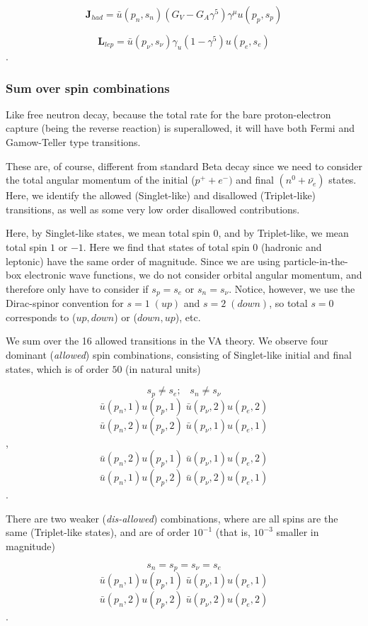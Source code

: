 \documentclass[%
 aip,
 jmp,%
 amsmath,amssymb,
 reprint,%
]{revtex4-1}
\begin{document}
$$\mathbf{J}_{had}=\bar{u}(p_{n},s_{n})(G_{V}-G_{A}\gamma^{5})\gamma^{\mu}u(p_{p},s_{p})$$

$$\mathbf{L}_{lep}=\bar{u}(p_{\nu},s_{\nu})\gamma_{u}(1-\gamma^{5})u(p_{e},s_{e})$$.

\subsubsection{Sum over spin combinations}

Like free neutron decay, because the total  rate for the bare proton-electron capture (being the reverse reaction)  is superallowed,  it will have both Fermi and Gamow-Teller type transitions.

These are, of course, different from standard Beta decay since we need to consider the total angular momentum of the initial ($p^{+}+e^{-})$ and final $(n^{0}+\bar{\nu_{e}})$ states.  
Here, we identify the allowed (Singlet-like) and disallowed (Triplet-like) transitions, as well as some very low order disallowed contributions.  


Here, by Singlet-like states, we  mean total spin 0, and by Triplet-like, we mean total  spin $1$ or $-1$.  Here we find that states of total spin 0 (hadronic and leptonic) have the same order of magnitude.   Since we are using particle-in-the-box electronic wave functions,  we do not consider orbital angular momentum, and therefore only have to consider if $s_{p}=s_{e}$ or  $s_{n}=s_{\nu}$. Notice, however, we use the Dirac-spinor convention for $s=1\;(up)$ and $s=2\;(down)$, so total $s=0$ corresponds to ($up,down$) or ($down,up$), etc.


We sum over the 16  allowed transitions in the VA theory.  
We observe four dominant (\emph{allowed}) spin combinations, 
consisting of Singlet-like initial and final states,  which is of order $50$ (in natural units)

$$s_{p}\neq s{_e};\;\;\;s_{n}\neq s_{\nu}$$
$$\bar{u}(p_{n},1)u(p_{p},1)\;\bar{u}(p_{\nu},2)u(p_{e},2)$$
$$\bar{u}(p_{n},2)u(p_{p},2)\;\bar{u}(p_{\nu},1)u(p_{e},1)$$,
$$\bar{u}(p_{n},2)u(p_{p},1)\;\bar{u}(p_{\nu},1)u(p_{e},2)$$
$$\bar{u}(p_{n},1)u(p_{p},2)\;\bar{u}(p_{\nu},2)u(p_{e},1)$$.

There are two weaker (\emph{dis-allowed}) combinations, 
where are all spins are the same (Triplet-like states), and are of order $10^{-1}$ (that is, $10^{-3}$ smaller in magnitude)

$$s_{n}=s_{p}=s_{\nu}=s{_e}$$
$$\bar{u}(p_{n},1)u(p_{p},1)\;\bar{u}(p_{\nu},1)u(p_{e},1)$$
$$\bar{u}(p_{n},2)u(p_{p},2)\;\bar{u}(p_{\nu},2)u(p_{e},2)$$.
\end{document}
